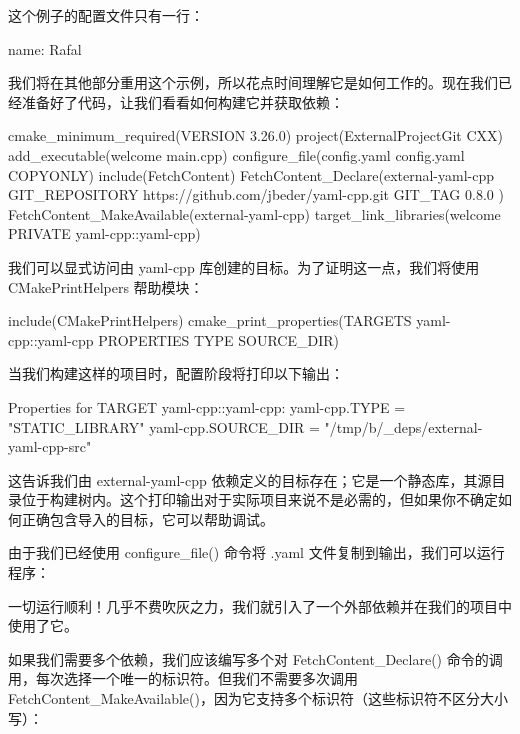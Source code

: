 这个例子的配置文件只有一行：


\begin{shell}
name: Rafal
\end{shell}

我们将在其他部分重用这个示例，所以花点时间理解它是如何工作的。现在我们已经准备好了代码，让我们看看如何构建它并获取依赖：


\begin{cmake}
cmake_minimum_required(VERSION 3.26.0)
project(ExternalProjectGit CXX)
add_executable(welcome main.cpp)
configure_file(config.yaml config.yaml COPYONLY)
include(FetchContent)
FetchContent_Declare(external-yaml-cpp
    GIT_REPOSITORY https://github.com/jbeder/yaml-cpp.git
    GIT_TAG 0.8.0
)
FetchContent_MakeAvailable(external-yaml-cpp)
target_link_libraries(welcome PRIVATE yaml-cpp::yaml-cpp)
\end{cmake}

我们可以显式访问由 yaml-cpp 库创建的目标。为了证明这一点，我们将使用 CMakePrintHelpers 帮助模块：

\begin{cmake}
include(CMakePrintHelpers)
cmake_print_properties(TARGETS yaml-cpp::yaml-cpp
                       PROPERTIES TYPE SOURCE_DIR)
\end{cmake}

当我们构建这样的项目时，配置阶段将打印以下输出：

\begin{shell}
Properties for TARGET yaml-cpp::yaml-cpp:
    yaml-cpp.TYPE = "STATIC_LIBRARY"
    yaml-cpp.SOURCE_DIR = "/tmp/b/_deps/external-yaml-cpp-src"
\end{shell}

这告诉我们由 external-yaml-cpp 依赖定义的目标存在；它是一个静态库，其源目录位于构建树内。这个打印输出对于实际项目来说不是必需的，但如果你不确定如何正确包含导入的目标，它可以帮助调试。

由于我们已经使用 configure\_file() 命令将 .yaml 文件复制到输出，我们可以运行程序：


一切运行顺利！几乎不费吹灰之力，我们就引入了一个外部依赖并在我们的项目中使用了它。

如果我们需要多个依赖，我们应该编写多个对 FetchContent\_Declare() 命令的调用，每次选择一个唯一的标识符。但我们不需要多次调用 FetchContent\_MakeAvailable()，因为它支持多个标识符（这些标识符不区分大小写）：

